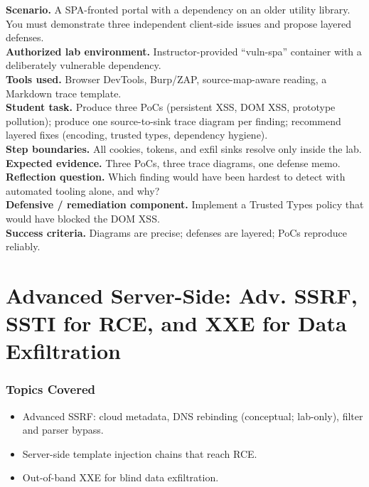 \documentclass[11pt,letterpaper,oneside]{report}
\begin{document}
\begin{labbox}
\textbf{Scenario.} A SPA-fronted portal with a dependency on an older utility library. You must demonstrate three independent client-side issues and propose layered defenses.\\[3pt]
\textbf{Authorized lab environment.} Instructor-provided ``vuln-spa'' container with a deliberately vulnerable dependency.\\[3pt]
\textbf{Tools used.} Browser DevTools, Burp/ZAP, source-map-aware reading, a Markdown trace template.\\[3pt]
\textbf{Student task.} Produce three PoCs (persistent XSS, DOM XSS, prototype pollution); produce one source-to-sink trace diagram per finding; recommend layered fixes (encoding, trusted types, dependency hygiene).\\[3pt]
\textbf{Step boundaries.} All cookies, tokens, and exfil sinks resolve only inside the lab.\\[3pt]
\textbf{Expected evidence.} Three PoCs, three trace diagrams, one defense memo.\\[3pt]
\textbf{Reflection question.} Which finding would have been hardest to detect with automated tooling alone, and why?\\[3pt]
\textbf{Defensive / remediation component.} Implement a Trusted Types policy that would have blocked the DOM XSS.\\[3pt]
\textbf{Success criteria.} Diagrams are precise; defenses are layered; PoCs reproduce reliably.
\end{labbox}

\chapter{Advanced Server-Side: Adv. SSRF, SSTI for RCE, and XXE for Data Exfiltration}

\subsection*{Topics Covered}
\begin{itemize}
  \item Advanced SSRF: cloud metadata, DNS rebinding (conceptual; lab-only), filter and parser bypass.
  \item Server-side template injection chains that reach RCE.
  \item Out-of-band XXE for blind data exfiltration.
\end{itemize}
\end{document}
